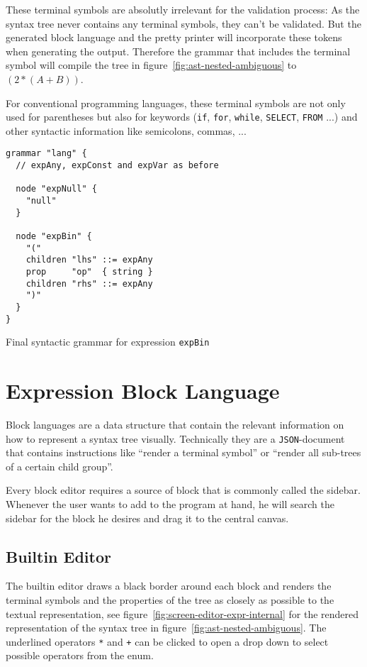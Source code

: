 \documentclass[sigconf,review=true]{acmart}
\begin{document}
These terminal symbols are absolutly irrelevant for the validation process: As the syntax tree never contains any terminal symbols, they can't be validated. But the generated block language and the pretty printer will incorporate these tokens when generating the output. Therefore the grammar that includes the terminal symbol will compile the tree in figure~\ref{fig:ast-nested-ambiguous} to $(2 * (A + B))$.

For conventional programming languages, these terminal symbols are not only used for parentheses but also for keywords (\texttt{if}, \texttt{for}, \texttt{while}, \texttt{SELECT}, \texttt{FROM} ...) and other syntactic information like semicolons, commas, ...

\begin{listing}[H]
\begin{verbatim}
grammar "lang" {
  // expAny, expConst and expVar as before

  node "expNull" {
    "null"
  }

  node "expBin" {
    "("
    children "lhs" ::= expAny
    prop     "op"  { string }
    children "rhs" ::= expAny
    ")"
  }
}
\end{verbatim}
\caption{Final syntactic grammar for expression \texttt{expBin}}
\label{lst:grammar-expr-expBin-syntax}
\end{listing}

\section{Expression Block Language}

Block languages are a data structure that contain the relevant information on how to represent a syntax tree visually. Technically they are a \texttt{JSON}-document that contains instructions like \enquote{render a terminal symbol} or \enquote{render all sub-trees of a certain child group}.

Every block editor requires a source of block that is commonly called the sidebar. Whenever the user wants to add to the program at hand, he will search the sidebar for the block he desires and drag it to the central canvas.

\subsection{Builtin Editor}

The builtin editor draws a black border around each block and renders the terminal symbols and the properties of the tree as closely as possible to the textual representation, see figure~\ref{fig:screen-editor-expr-internal} for the rendered representation of the syntax tree in figure~\ref{fig:ast-nested-ambiguous}. The underlined operators \texttt{*} and \texttt{+} can be clicked to open a drop down to select possible operators from the enum.
\end{document}
